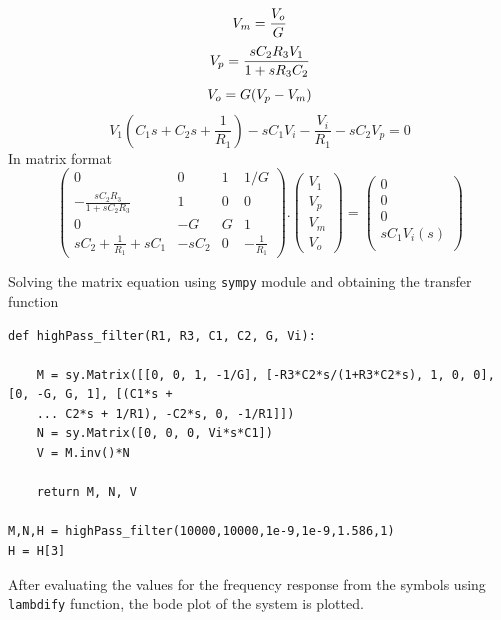 \documentclass[12pt, a4paper]{report}
\begin{document}
\begin{equation}
V_m = \frac{V_o}{G}\\
\end{equation}
\begin{equation}
V_p = \frac{sC_2R_3V_1}{1 + sR_3C_2}\\
\end{equation}
\begin{equation}
V_o = G(V_p - V_m)\\
\end{equation}
\begin{equation}
V_1(C_1s + C_2s + \frac{1}{R_1}) - sC_1V_i - \frac{V_i}{R_1} - sC_2V_p = 0
\end{equation}
\clearpage
In matrix format
\begin{equation*}
\begin{pmatrix}
0   & 0 & 1  & 1/G \\
-\frac{sC_2R_3}{1+sC_2R_3}  & 1 & 0 & 0\\
0  & -G & G & 1 \\
sC_2 + \frac{1}{R_1} + sC_1 & -sC_2 & 0 & -\frac{1}{R_1}
\end{pmatrix}
.
\begin{pmatrix}
V_1\\
V_p\\
V_m \\
V_o
\end{pmatrix}
=
\begin{pmatrix}
0 \\
0 \\
0 \\
sC_1V_i(s) \\
\end{pmatrix}
\end{equation*}

Solving the matrix equation using \texttt{sympy} module and obtaining the transfer function
\begin{verbatim}
def highPass_filter(R1, R3, C1, C2, G, Vi):

    M = sy.Matrix([[0, 0, 1, -1/G], [-R3*C2*s/(1+R3*C2*s), 1, 0, 0], [0, -G, G, 1], [(C1*s + 
    ... C2*s + 1/R1), -C2*s, 0, -1/R1]])
    N = sy.Matrix([0, 0, 0, Vi*s*C1])
    V = M.inv()*N

    return M, N, V

M,N,H = highPass_filter(10000,10000,1e-9,1e-9,1.586,1)
H = H[3]
\end{verbatim}

After evaluating the values for the frequency response from the symbols using \texttt{lambdify} function, the bode plot of the system is plotted.
\end{document}
